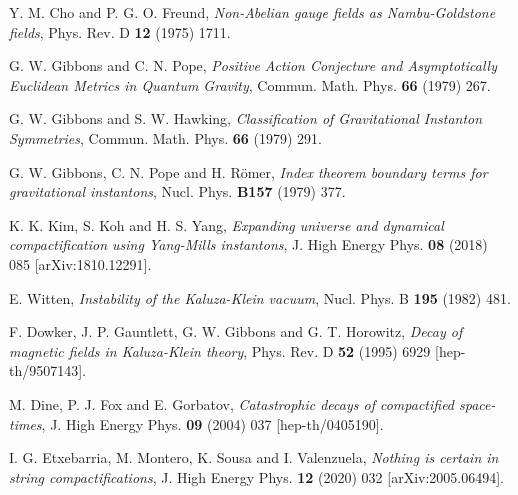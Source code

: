 \documentclass[12pt,epsf]{article}
\begin{document}
\begin{thebibliography}{55}
 Y. M. Cho and P. G. O. Freund, {\it Non-Abelian gauge fields as Nambu-Goldstone fields},
Phys. Rev. D {\bf 12} (1975) 1711.



 G. W. Gibbons and C. N. Pope, {\it Positive Action Conjecture and
Asymptotically Euclidean Metrics in Quantum Gravity}, Commun. Math. Phys. {\bf 66} (1979) 267.



 G. W. Gibbons and S. W. Hawking, {\it Classification of Gravitational Instanton Symmetries},
Commun. Math. Phys. {\bf 66} (1979) 291.



 G. W. Gibbons, C. N. Pope and H. R\"omer, {\it Index theorem boundary terms for gravitational instantons},
Nucl. Phys. {\bf B157} (1979) 377.



 K. K. Kim, S. Koh and H. S. Yang, {\it Expanding universe and dynamical compactification
using Yang-Mills instantons}, J. High Energy Phys. {\bf 08} (2018) 085 [arXiv:1810.12291].




 E. Witten, {\it Instability of the Kaluza-Klein vacuum},
Nucl. Phys. B {\bf 195} (1982) 481.




 F. Dowker, J. P. Gauntlett, G. W. Gibbons and G. T. Horowitz,
{\it Decay of magnetic fields in Kaluza-Klein theory}, Phys. Rev. D {\bf 52} (1995) 6929 [hep-th/9507143].




 M. Dine, P. J. Fox and E. Gorbatov, {\it Catastrophic decays of compactified space-times},
J. High Energy Phys. {\bf 09} (2004) 037 [hep-th/0405190].



 I. G. Etxebarria, M. Montero, K. Sousa and I. Valenzuela,
{\it Nothing is certain in string compactifications}, J. High Energy Phys. {\bf 12} (2020) 032 [arXiv:2005.06494].





\end{thebibliography}
\end{document}
